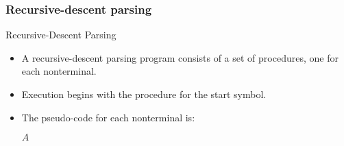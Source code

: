 \begin{bibunit}[apalike]
\subsubsection{Recursive-descent parsing}

\tableofcontentslide[sectionstyle={show/shaded},subsectionstyle={show/shaded/hide},subsubsectionstyle={show/shaded/hide/hide}]

\begin{frame}{Recursive-Descent Parsing}
	\begin{itemize}
	\item A recursive-descent parsing program consists of a set of procedures, one for each nonterminal.
	\vfill
	\item Execution begins with the procedure for the start symbol.
	\vfill
	\item The pseudo-code for each nonterminal is:
		\begin{scriptsize}
		\begin{myprocedure}{$A$}{}
		\end{myprocedure}
		\end{scriptsize}
	\end{itemize}
\end{frame}


\end{bibunit}

